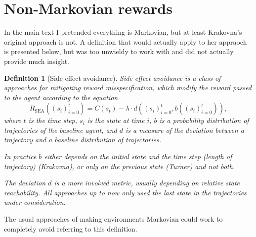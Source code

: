 \documentclass{article}
\newtheorem{definition}{Definition}
\newcommand{\rewardFunction}{R}
\newcommand{\modifiedRewardFunction}{\rewardFunction_{\mathrm{SEA}}}
\newcommand{\corruption}{C}
\newcommand{\deviationFromBaseline}{d}
\newcommand{\baseline}{b}
\begin{document}
	\section{Non-Markovian rewards}
	 In the main text I pretended everything is Markovian, but at least Krakovna's original approach
		is not. A definition that would actually apply to her appraoch is presented below,
		but was too unwieldy to work with and did not actually provide much insight.
		\begin{definition}[Side effect avoidance]
			\emph{Side effect avoidance} is a class of approaches for mitigating reward misspecification, which
			modify the reward passed to the agent according to the equation
			\begin{equation}
				\modifiedRewardFunction\left( \left( s_i \right)_{i=0}^t \right) =
				\corruption\left( s_t \right) -
				\lambda \cdot \deviationFromBaseline\left( \left( s_i \right)_{i=0}^t, \baseline\left( \left( s_i \right)_{i=0}^t \right) \right),
				\label{eq:sideEffectAvoidance-nonMarkov}
			\end{equation}
			where $t$ is the time step, $s_i$ is the state at time $i$, $\baseline$ is a probability
			distribution of trajectories of the baseline agent, and $\deviationFromBaseline$ is a measure
			of the deviation between a trajectory and a baseline distribution of trajectories.

			In practice $\baseline$ either depends on the initial state and the time step
			(length of trajectory) (Krakovna), or only on the previous state (Turner)	and not both.

			The deviation $\deviationFromBaseline$ is a more involved metric, usually depending on
			relative state	reachability. All approaches up to now only used the last state
			in the trajectories under consideration.
			\label{def:SEA-nonMarkov}
		\end{definition}
		The usual approaches of making environments Markovian could work to completely avoid referring
		to this definition.
\end{document}
